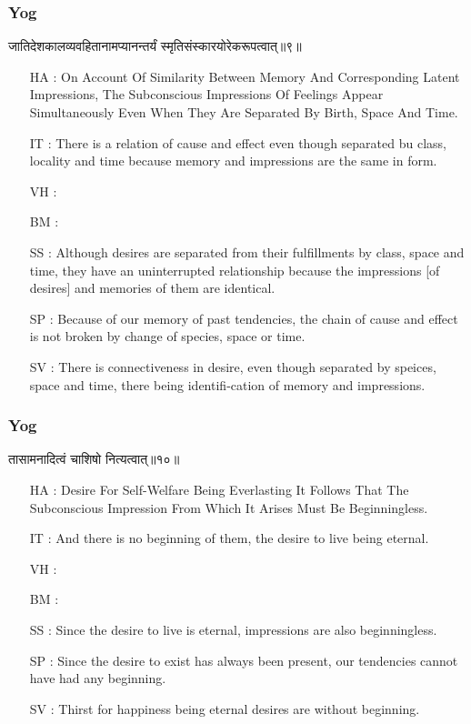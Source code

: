 \begin{frame}[fragile]\frametitle{Yog}
\begin{sanskrit}
जातिदेशकालव्यवहितानामप्यानन्तर्यं स्मृतिसंस्कारयोरेकरूपत्वात्॥९॥
\end{sanskrit}

	\begin{itemize}
	\item [HA]: On Account Of Similarity Between Memory And Corresponding Latent Impressions, The Subconscious Impressions Of Feelings Appear Simultaneously Even When They Are Separated By Birth, Space And Time.
	\item [IT]: There is a relation of cause and effect even though separated bu class, locality and time because memory and impressions are the same in form.
	\item [VH]: 
	\item [BM]: 
	\item [SS]: Although desires are separated from their fulfillments by class, space and time, they have an uninterrupted relationship because the impressions [of desires] and memories of them are identical.
	\item [SP]: Because of our memory of past tendencies, the chain of cause and effect is not broken by change of species, space or time.
	\item [SV]: There is connectiveness in desire, even though separated by speices, space and time, there being identifi-cation of memory and impressions. 
	\end{itemize}
\end{frame}


\begin{frame}[fragile]\frametitle{Yog}
\begin{sanskrit}
तासामनादित्वं चाशिषो नित्यत्वात्॥१०॥
\end{sanskrit}

	\begin{itemize}
	\item [HA]: Desire For Self-Welfare Being Everlasting It Follows That The Subconscious Impression From Which It Arises Must Be Beginningless.
	\item [IT]: And there is no beginning of them, the desire to live being eternal.
	\item [VH]: 
	\item [BM]: 
	\item [SS]: Since the desire to live is eternal, impressions are also beginningless.
	\item [SP]: Since the desire to exist has always been present, our tendencies cannot have had any beginning.
	\item [SV]: Thirst for happiness being eternal desires are without beginning. 
	\end{itemize}
\end{frame}

